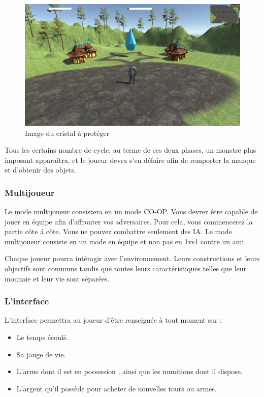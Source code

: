 \documentclass[a4paper, 12pt]{article}
\begin{document}
		\bigbreak
		\begin{figure}[!ht]
			\centerline{\includegraphics[scale=0.3]{cristalprojet.png}}
			\caption*{Image du cristal à protéger}
		\end{figure}
		\par Tous les certains nombre de cycle, au terme de ces deux phases, un monstre plus imposant apparaitra, et le joueur devra s'en défaire afin de remporter la manque et d'obtenir des objets.
		\subsubsection{Multijoueur}
		Le mode multijoueur consistera en un mode CO-OP. Vous devrez \^etre capable de jouer en \'equipe afin d'affronter vos adversaires. Pour cela, vous commencerez la partie c\^ote \'a c\^ote. Vous ne pouvez combattre seulement des IA. Le mode multijoueur consiste en un mode en \'equipe et non pas en 1vs1 contre un ami.
		\par Chaque joueur pourra int\'eragir avec l'environnement. Leurs constructions et leurs objectifs sont communs tandis que toutes leurs caract\'eristiques telles que leur monnaie et leur vie sont s\'epar\'ees.
		\subsubsection{L'interface}
		L’interface permettra au joueur d'être renseignée à tout moment sur : 
		\begin{itemize}
		\item Le temps écoulé.
		\item Sa jauge de vie.
		\item L’arme dont il est en possession , ainsi que les  munitions dont il dispose.
		\item L’argent qu’il possède pour acheter de nouvelles tours ou armes.
		\end{itemize}
\end{document}
